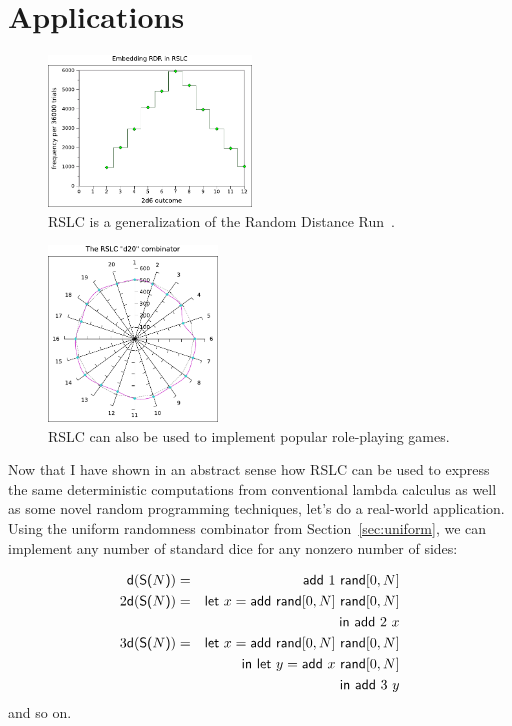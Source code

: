 \documentclass[10pt]{sigplanconf}
\begin{document}
\section{Applications}

\begin{figure}[t]
	\begin{center}
	\includegraphics[width=0.48\textwidth]{rslc-rdr.pdf}
	\end{center}
	\caption{RSLC is a generalization of the Random Distance Run~\cite{rdr}.}
	\label{fig:rdr}
\end{figure}

\begin{figure}[t]
	\begin{center}
	\includegraphics[width=0.40\textwidth]{rslc-d20.pdf}
	\end{center}
	\caption{RSLC can also be used to implement popular role-playing games.}
	\label{fig:d20}
\end{figure}

Now that I have shown in an abstract sense how RSLC can be used to express the same deterministic computations from conventional lambda calculus as well as some novel random programming techniques, let's do a real-world application.
Using the uniform randomness combinator from Section~\ref{sec:uniform}, we can implement any number of standard dice for any nonzero number of sides:

\begin{eqnarray*}
	\mathsf{d}(\textsf{S(}N\textsf{)}) &=& \mathsf{add}~1~\mathsf{rand}[0,N] \\
       2\mathsf{d}(\textsf{S(}N\textsf{)}) &=& \mathsf{let}~x=\mathsf{add}~\mathsf{rand}[0,N]~\mathsf{rand}[0,N] \\
	&& \mathsf{in}~\mathsf{add}~2~x \\
       3\mathsf{d}(\textsf{S(}N\textsf{)}) &=& \mathsf{let}~x=\mathsf{add}~\mathsf{rand}[0,N]~\mathsf{rand}[0,N] \\
	&& \mathsf{in}~\mathsf{let}~y=\mathsf{add}~x~\mathsf{rand}[0,N] \\
	&& \mathsf{in}~\mathsf{add}~3~y
\end{eqnarray*}
and so on.
\end{document}
